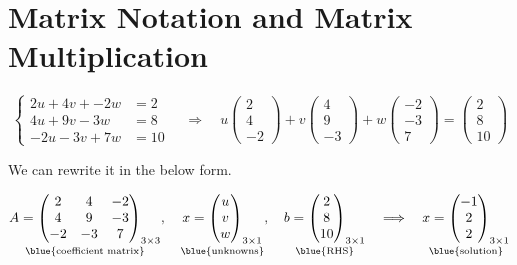 \section{Matrix Notation and Matrix Multiplication}

\[
\begin{cases}
    2u + 4v + -2w &= 2\\
    4u + 9v -3w &= 8\\
    -2u -3v + 7w &= 10
\end{cases}
\quad \Longrightarrow \quad
u\left(\begin{matrix}
2 \\4 \\-2
\end{matrix}\right) + 
v\left(\begin{matrix}
4 \\9 \\-3
\end{matrix}\right) +
w\left(\begin{matrix}
-2 \\-3 \\7
\end{matrix}\right) = 
\left(\begin{matrix}
2 \\8 \\10
\end{matrix}\right)
\] 

We can rewrite it in the below form.

\[
\underset{\blue{\text{coefficient matrix}}}{A=\left(\begin{matrix}
2 & 4 & -2 \\
4 & 9 & -3 \\
-2 & -3 & 7
\end{matrix}\right)_{3\times3}}, \quad
\underset{\blue{\text{unknowns}}}{x = \left(\begin{matrix}
u \\v \\w
\end{matrix}\right)_{3\times1}}, \quad
\underset{\blue{\text{RHS}}}{b=\left(\begin{matrix}
2 \\8 \\10
\end{matrix}\right)_{3\times1}}\quad\Longrightarrow\quad
\underset{\blue{\text{solution}}}{x = \left(\begin{matrix}
-1 \\2 \\2
\end{matrix}\right)_{3\times1}}
\]

